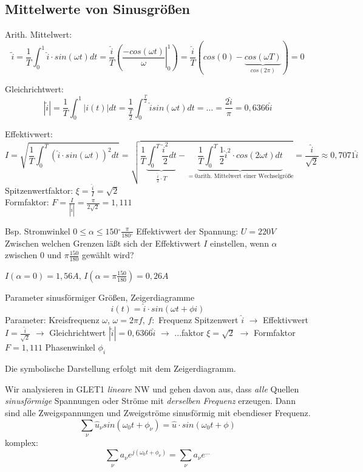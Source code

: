 \documentclass[german]{article}
\newcommand{\degree}{\ensuremath{^\circ}}
\begin{document}
\subsection{Mittelwerte von Sinusgrößen}
Arith. Mittelwert:
	\[ \tilde{i} = \frac1T \int_0^1 \hat{i} \cdot sin(\omega t) dt = \frac{\hat{i}}T \left( \left. \frac{- cos(\omega t)}\omega \right|_0^1 \right) = \frac{\hat{i}}T \left( cos(0) - \underbrace{cos(\omega T)}_{cos(2\pi)}\right) = 0 \]

Gleichrichtwert:
	\[ | \tilde{i} | = \frac1T \int_0^1 |i(t)| dt = \frac1{\frac{T}2} \int_0^{\frac{T}2} \hat{i} sin(\omega t) dt = \ldots = \frac{2\hat{i}}\pi = 0,6366 \hat{i} \]

Effektivwert:
	\[ I = \sqrt{ \frac1T \int_0^T \left( \hat{i} \cdot sin(\omega t) \right)^2 dt } = \sqrt{ \frac1T \underbrace{\int_0^T \frac{{\hat{i}}^2}2 dt}_{\frac{\hat{i}}2 \cdot T} - \underbrace{\frac1T \int_0^T \frac12 {\hat{i}}^2 \cdot cos(2\omega t) dt}_{=0 \text{arith. Mittelwert einer Wechselgröße}} } = \frac{\hat{i}}{\sqrt{2}} \approx 0,7071 \hat{i}\]
	Spitzenwertfaktor: $\xi = \frac{\hat{i}}I = \sqrt{2}$ \\
	Formfaktor: $F = \frac{I}{|\tilde{i}|} = \frac{\pi}{2 \sqrt{2}} = 1,111$

Bsp. %
Stromwinkel $0 \leq \alpha \leq 150\degree \frac{\pi}{180\degree}$
Effektivwert der Spannung: $U = 220V$
Zwischen welchen Grenzen läßt sich der Effektivwert $I$ einstellen, wenn $\alpha$ zwischen $0$ und $\pi \frac{150}{180}$ gewählt wird?


$I(\alpha = 0) = 1,56 A$, $I(\alpha = \pi \frac{150}{180}) = 0,26A$

Parameter sinusförmiger Größen, Zeigerdiagramme
\[ i(t) = \hat{i} \cdot sin(\omega t + \phi i) \]
Parameter: Kreisfrequenz $\omega$, $\omega = 2 \pi f$, $f:$ Frequenz
Spitzenwert $\hat{i}$
	$\rightarrow$ Effektivwert $I = \frac{\hat{i}}{\sqrt{2}}$
	$\rightarrow$ Gleichrichtwert $|\tilde{i}| = 0,6366 \hat{i}$
	$\rightarrow$ ...faktor $\xi = \sqrt{2}$
	$\rightarrow$ Formfaktor $F = 1,111$
Phasenwinkel $\phi_i$

Die symbolische Darstellung erfolgt mit dem Zeigerdiagramm.

Wir analysieren in GLET1 {\it lineare} NW und gehen davon aus, dass {\it alle} Quellen {\it sinusförmige} Spannungen oder Ströme mit {\it derselben Frequenz} erzeugen. Dann sind alle Zweigspannungen und Zweigströme sinusförmig mit ebendieser Frequenz.
\[ \sum_{\nu} \hat{u}_{\nu} sin( \omega_0 t + \phi_{\nu} ) = \hat{u} \cdot sin( \omega_0 t + \phi ) \]
komplex:
\[ \sum_{\nu} a_{\nu} e^{j(\omega_0 t + \phi_{\nu})} = \sum_{\nu} a_{\nu} e^{...} \] %
\end{document}
